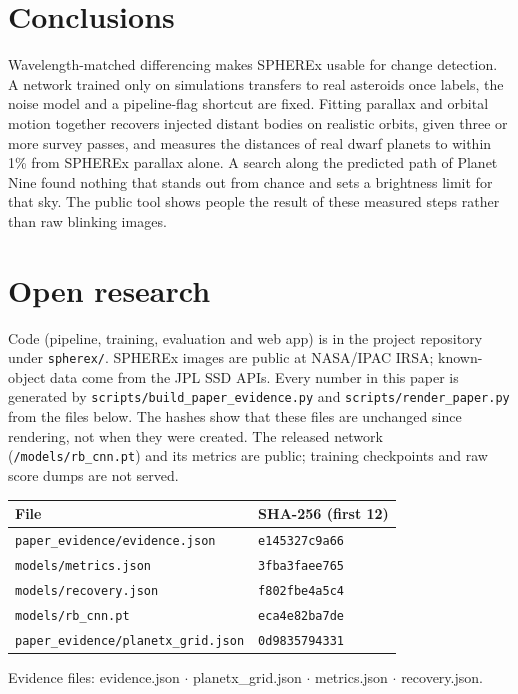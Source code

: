 \documentclass[twocolumn]{aastex631}
\begin{document}
\section{Conclusions}
\label{sec:conclusions}
Wavelength-matched differencing makes SPHEREx usable for change detection. A network trained only on simulations transfers to real asteroids once labels, the noise model and a pipeline-flag shortcut are fixed. Fitting parallax and orbital motion together recovers injected distant bodies on realistic orbits, given three or more survey passes, and measures the distances of real dwarf planets to within 1\% from SPHEREx parallax alone. A search along the predicted path of Planet Nine found nothing that stands out from chance and sets a brightness limit for that sky. The public tool shows people the result of these measured steps rather than raw blinking images.

\section*{Open research}
Code (pipeline, training, evaluation and web app) is in the project repository under \texttt{spherex/}. SPHEREx images are public at NASA/IPAC IRSA; known-object data come from the JPL SSD APIs. Every number in this paper is generated by \texttt{scripts/build\_paper\_evidence.py} and \texttt{scripts/render\_paper.py} from the files below. The hashes show that these files are unchanged since rendering, not when they were created. The released network (\texttt{/models/rb\_cnn.pt}) and its metrics are public; training checkpoints and raw score dumps are not served.

\begin{table}[t]
\centering
\footnotesize

\begin{tabularx}{\columnwidth}{Xl}
\hline\hline
File & SHA-256 (first 12) \\
\hline
\texttt{paper\_evidence/evidence.json} & \texttt{e145327c9a66} \\
\texttt{models/metrics.json} & \texttt{3fba3faee765} \\
\texttt{models/recovery.json} & \texttt{f802fbe4a5c4} \\
\texttt{models/rb\_cnn.pt} & \texttt{eca4e82ba7de} \\
\texttt{paper\_evidence/planetx\_grid.json} & \texttt{0d9835794331} \\
\hline
\end{tabularx}
\end{table}
Evidence files: evidence.json $\cdot$ planetx\_grid.json $\cdot$ metrics.json $\cdot$ recovery.json.
\end{document}

